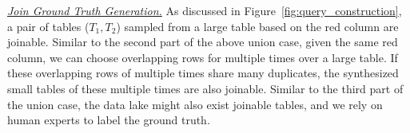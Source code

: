 






\noindent \underline{\textit{Join Ground Truth Generation.}} 
As discussed in Figure~\ref{fig:query_construction}, a pair of tables (\eg $T_1, T_2$) sampled from a large table based on the red column are joinable. Similar to the second part of the above union case,  given the same red column, we can  choose  overlapping rows for multiple times over a large table. If  these overlapping rows of multiple times share many duplicates, the synthesized small tables of these multiple times are also joinable.
Similar to the third part of the  union case, the data lake might also exist joinable tables, and we rely on human experts to label the ground truth.

